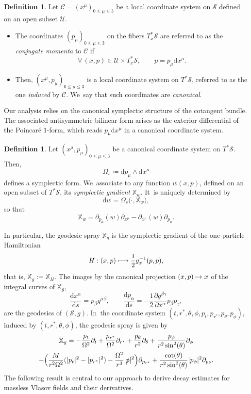 \documentclass[JEP,XML,SOM,Unicode,published]{cedram}
\newcommand\mto{\mathchoice{\longmapsto}{\mapsto}{\mapsto}{\mapsto}}
\theoremstyle{plain}
\theoremstyle{definition}
\newtheorem{definition}[proposition]{Definition}
\newcommand\T{{\mathbb{X}}}
\newcommand\dr{{\mathrm{d}}}
\begin{document}
\begin{definition}\label{Defcoord}
Let $\mathscr{C}=(x^{\mu})_{0 \leq \mu \leq 3}$ be a local coordinate system on $\mathcal{S}$ defined on an open subset $\mathcal{U}$.
\begin{itemize}
\item The coordinates $(p_\mu)_{0 \leq \mu \leq 3}$ on the fibers $T_x^* \mathcal{S}$ are referred to as the \emph{conjugate momenta} to $\mathscr{C}$ if
\[
\forall \, (x,p) \in \mathcal{U} \times T_x^* \mathcal{S},\qquad p=p_\mu \dr x^\mu.
\]
\item Then, $(x^\mu,p_\mu)_{0 \leq \mu \leq 3}$ is a local coordinate system on $T^* \mathcal{S}$, referred to as the one \emph{induced} by $\mathscr{C}$. We~say that such coordinates are \emph{canonical}.
\end{itemize}
\end{definition}

Our analysis relies on the canonical symplectic structure of the cotangent bundle. The associated antisymmetric bilinear form arises as the exterior differential of the Poincaré $1$-form, which reads $p_\mu \dr x^\mu$ in a canonical coordinate system.

\begin{definition}
Let $(x^\mu,p_\mu)_{0 \leq \mu \leq 3}$ be a canonical coordinate system on $T^* \mathcal{S}$. Then,
\[
\Omega_s \coloneqq \dr p_\mu \wedge \dr x^\mu
\]
defines a symplectic form. We~associate to any function $w (x,p)$, defined on an open subset of $T^* \mathcal{S}$, its \emph{symplectic gradient} $\T_w$. It~is uniquely determined by
\[
\dr w = \Omega_s \bigl(\cdot, \T_w \bigr),
\]
so that
\[
\T_w = \partial_{p_\mu}(w) \partial_{x^\mu}-\partial_{x^\mu}(w) \partial_{p_\mu}.
\]
\end{definition}

In particular, the geodesic spray $\T_g$ is the symplectic gradient of the one-particle Hamiltonian
\[
H:(x,p) \mto \frac{1}{2}g^{-1}_x(p,p),
\]
that is, $\T_g := \T_H$. The images by the canonical projection $(x,p) \mto x$ of the integral curves of $\T_g$,
\[
\frac{\dr x^{\alpha}}{\dr s}=p_{\beta}g^{\alpha\beta}, \qquad \frac{\dr p_{\alpha}}{\dr s}=-\frac{1}{2}\frac{\partial g^{\beta\gamma}}{\partial x^{\alpha}}p_{\beta}p_{ \gamma},
\]
are the geodesics of $(\mathcal{S},g)$. In~the coordinate system $(t,r^*,\theta,\phi,p_t,p_{r^*},p_\theta,p_\phi)$, induced by $(t,r^*,\theta,\phi)$, the geodesic spray is given by
\begin{multline*}
\mathbb{X}_{g}=-\frac{p_t}{\Omega^2} \partial_t + \frac{p_{r^*}}{\Omega^2} \partial_{r^*}+\frac{p_{\theta}}{r^2} \partial_{\theta} + \frac{p_{\phi}}{r^2 \sin^2 (\theta)} \partial_{\phi} \\
-\Bigl(\frac{M}{r^2\Omega^2}(|p_t|^2-|p_{r^*}|^2)-\frac{\Omega^2}{r^3}|\slashed{p}|^2 \Bigr) \partial_{p_{r^*} }+\frac{\cot (\theta)}{r^2 \sin^2 (\theta)} |p_{\phi}|^2 \partial_{p_{\theta} }.
\end{multline*}
The following result is central to our approach to derive decay estimates for massless Vlasov fields and their derivatives.
\end{document}
